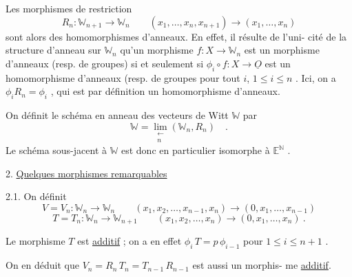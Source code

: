 Les morphismes de restriction
\[
R_n : \mathbb{W}_{n+1} \to \mathbb{W}_n \qquad (x_1,\ldots,x_n,x_{n+1}) \to (x_1,\ldots,x_n)
\]
sont alors des homomorphismes d'anneaux. En effet, il résulte de l'uni-%
cité de la structure d'anneau sur $\mathbb{W}_n$ qu'un morphisme $f : X \to \mathbb{W}_n$ est
un morphisme d'anneaux (resp. de groupes) si et seulement si $\phi_i \circ f : X \to \underline{O}$
est un homomorphisme d'anneaux (resp. de groupes pour tout $i$, $1 \leq i \leq n$ .
Ici, on a $\phi_i R_n = \phi_i$ , qui est par définition un homomorphisme d'anneaux.

On définit le schéma en anneau des vecteurs de Witt $\mathbb{W}$ par
\[
\mathbb{W} = \lim_{\substack{\leftarrow \\ n}} (\mathbb{W}_n , R_n) \quad .
\]
Le schéma sous-jacent à $\mathbb{W}$ est donc en particulier isomorphe à $\mathbb{E}^{\mathbb{N}}$ .

2. \uline{Quelques morphismes remarquables}

2.1. On définit
\[
V = V_n : \mathbb{W}_n \to \mathbb{W}_n \qquad (x_1,x_2,\ldots,x_{n-1},x_n) \to (0,x_1,\ldots,x_{n-1})
\]
\[
T = T_n : \mathbb{W}_n \to \mathbb{W}_{n+1} \qquad (x_1,x_2,\ldots,x_n) \to (0,x_1,\ldots,x_n) \ .
\]

Le morphisme $T$ est \uline{additif} ; on a en effet $\phi_i\, T = p\, \phi_{i-1}$
pour $1 \leq i \leq n+1$ .

On en déduit que $V_n = R_n\, T_n = T_{n-1}\, R_{n-1}$ est aussi un morphis-%
me \uline{additif}.

